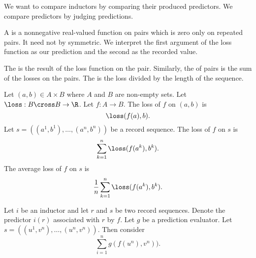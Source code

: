 
\sbasic
























\sstart
{}


We want to compare inductors
by comparing their produced predictors.
We compare predictors by judging predictions.


A  is a nonnegative
real-valued function on pairs
which is zero only on repeated pairs.
It need not by symmetric.
We interpret the first argument of the
loss function as our prediction
and the second as the recorded value.

The  is the
result of the loss function on the pair.
Similarly, the  of
pairs is the sum of the losses on the pairs.
The  is
the loss divided by the length of the sequence.


Let $(a, b) \in A \times B$
where $A$ and $B$ are non-empty sets.
Let $\loss: B \cross B \to \R$.
Let $f: A \to B$.
The loss of $f$ on $(a, b)$ is
\[
  \loss(f(a),b).
\]
Let $s = ((a^1, b^1), \dots, (a^n, b^n))$
be a record sequence.
The loss of $f$ on $s$ is
\[
  \sum_{k = 1}^{n} \loss(f(a^k), b^k).
\]
The average loss of $f$ on $s$ is
\[
  \frac{1}{n} \sum_{k = 1}^{n} \loss(f(a^k), b^k).
\]




Let $i$ be an inductor and let
$r$ and $s$ be two record sequences.
Denote the predictor $i(r)$ associated
with $r$ by $f$.
Let $g$ be a prediction evaluator.
Let $s = ((u^1, v^n), \dots, (u^n, v^n))$.
Then consider
\[
  \sum_{i = 1}^{n} g(f(u^n), v^n)).
\]



